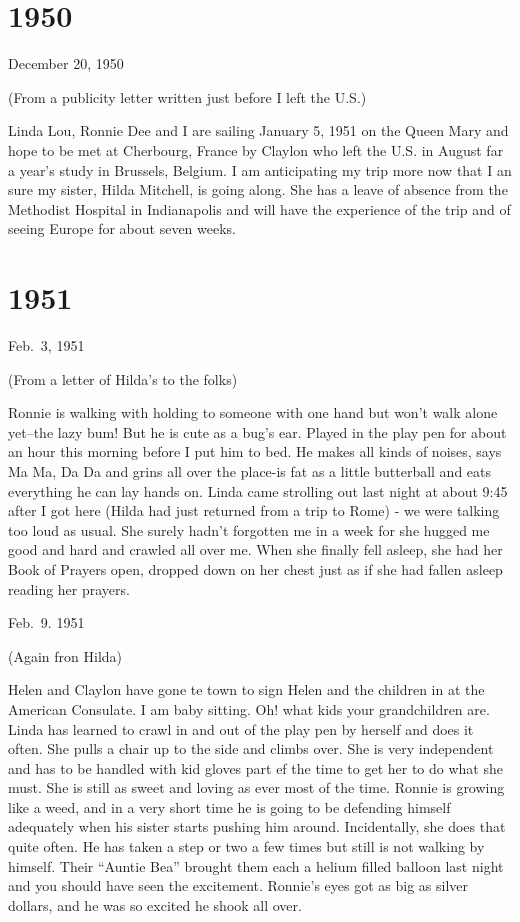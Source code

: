 \documentclass[]{book}
\begin{document}
\hypertarget{section-1}{%
\chapter{1950}\label{section-1}}

December 20, 1950

(From a publicity letter written just before I left the U.S.)

Linda Lou, Ronnie Dee and I are sailing January 5, 1951 on the Queen Mary and hope to be met at Cherbourg, France by Claylon who left the U.S. in August far a year's study in Brussels, Belgium. I am anticipating my trip more now that I an sure my sister, Hilda Mitchell, is going along. She has a leave of absence from the Methodist Hospital in Indianapolis and will have the experience of the trip and of seeing Europe for about seven weeks.

\hypertarget{section-2}{%
\chapter{1951}\label{section-2}}

Feb.~3, 1951

(From a letter of Hilda's to the folks)

Ronnie is walking with holding to someone with one hand but won't walk alone yet--the lazy bum! But he is cute as a bug's ear. Played in the play pen for about an hour this morning before I put him to bed. He makes all kinds of noises, says Ma Ma, Da Da and grins all over the place-is fat as a little butterball and eats everything he can lay hands on. Linda came strolling out last night at about 9:45 after I got here (Hilda had just returned from a trip to Rome) - we were talking too loud as usual. She surely hadn't forgotten me in a week for she hugged me good and hard and crawled all over me. When she finally fell asleep, she had her Book of Prayers open, dropped down on her chest just as if she had fallen asleep reading her prayers.

Feb.~9. 1951

(Again fron Hilda)

Helen and Claylon have gone te town to sign Helen and the children in at the American Consulate. I am baby sitting. Oh! what kids your grandchildren are. Linda has learned to crawl in and out of the play pen by herself and does it often. She pulls a chair up to the side and climbs over. She is very independent and has to be handled with kid gloves part ef the time to get her to do what she must. She is still as sweet and loving as ever most of the time. Ronnie is growing like a weed, and in a very short time he is going to be defending himself adequately when his sister starts pushing him around. Incidentally, she does that quite often. He has taken a step or two a few times but still is not walking by himself. Their ``Auntie Bea'' brought them each a helium filled balloon last night and you should have seen the excitement. Ronnie's eyes got as big as silver dollars, and he was so excited he shook all over.
\end{document}
